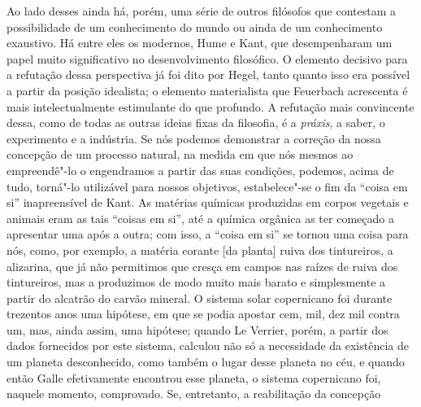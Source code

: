 Ao lado desses ainda há, porém, uma série de outros filósofos que
contestam a possibilidade de um conhecimento do mundo ou ainda de um
conhecimento exaustivo. Há entre eles os
modernos, Hume e Kant,
que desempenharam um papel muito significativo no desenvolvimento
filosófico. O elemento decisivo para a refutação dessa perspectiva já foi
dito por Hegel, tanto quanto isso era possível a partir da posição %
idealista; o elemento materialista
que Feuerbach acrescenta
é mais intelectualmente estimulante do que profundo. A refutação mais
convincente dessa, como de todas as outras ideias fixas %
da filosofia, é a \emph{práxis}, a saber, o 
experimento e a indústria. Se nós podemos demonstrar a correção da nossa
concepção de um processo natural, na medida em que nós mesmos ao
empreendê"-lo o engendramos a partir das suas condições, podemos, acima
de tudo, torná"-lo utilizável para nossos objetivos, estabelece"-se o fim
da ``coisa em si'' inapreensível
de Kant.
As matérias químicas produzidas em corpos vegetais e animais eram as
tais ``coisas em si'', até a química orgânica as ter começado a
apresentar uma após a outra; com isso, a ``coisa em si'' se tornou uma
coisa para nós, como, por exemplo, a matéria corante {[}da planta{]}
ruiva dos tintureiros, a alizarina, que já não permitimos que cresça em
campos nas raízes de ruiva dos tintureiros, mas a produzimos de modo
muito mais barato e simplesmente a partir do alcatrão do carvão mineral.
O sistema solar copernicano foi durante trezentos anos uma hipótese, em
que se podia apostar cem, mil, dez mil contra um, mas, ainda assim, uma
hipótese; quando Le Verrier, porém, a partir dos dados fornecidos por
este sistema, calculou não só a necessidade da existência de um planeta
desconhecido, como também o lugar desse planeta no céu, e quando então
Galle efetivamente encontrou esse planeta,
o sistema copernicano foi, naquele momento, comprovado. Se, entretanto, a reabilitação da concepção %
